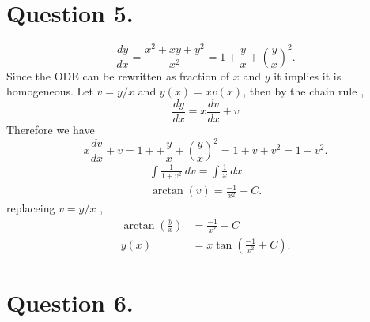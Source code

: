 \documentclass[
	12pt,
	]{article}
\theoremstyle{definition}
\theoremstyle{definition}
\theoremstyle{definition}
\theoremstyle{definition}
\theoremstyle{definition}
\theoremstyle{example}
\theoremstyle{note}
\theoremstyle{remark}
\theoremstyle{example}
\begin{document}
			\section{Question 5. }
				\begin{equation*}
					\frac{dy}{dx}= \frac{x^{2} + xy + y^{2}}{x^{2}} = 1+\frac{y}{x} + \left(\frac{y}{x}\right)^{2}. 
				\end{equation*}
				Since the ODE can be rewritten as fraction of $x$ and $y$ it implies it is homogeneous.
				Let $v = y/x$ and $y(x) = xv(x)$, then by the chain rule , 
				$$ \frac{dy}{dx} = x\frac{dv}{dx} +v$$
				Therefore we have 
				\begin{equation*}
					x\frac{dv}{dx} + v = 1 + +\frac{y}{x} + \left(\frac{y}{x}\right)^{2} = 1 + v + v^{2} = 1+ v^{2}.
				\end{equation*}
				\begin{gather*}
					\int \frac{1}{1+v^{2}} \ dv = \int \frac{1}{x} \ dx \\
					\arctan(v) = \frac{-1}{x^{2}} + C.
				\end{gather*}
				replaceing $v = y/x$ , 
				\begin{align*}
					\arctan(\frac{y}{x}) &= \frac{-1}{x^{2}} + C \\
					y(x) &= x \tan\left(\frac{-1}{x^{2}} + C\right).
				\end{align*}
			\section{Question 6. }
\end{document}
